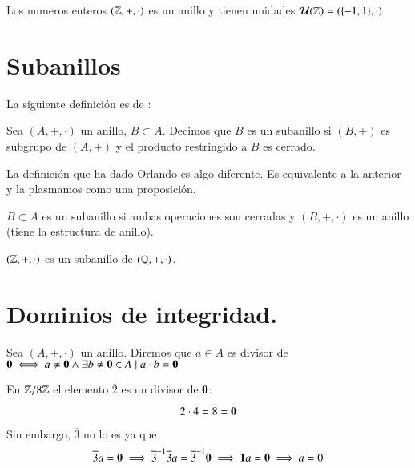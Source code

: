 \begin{ej}
	Los numeros enteros $(\mathbb{Z}, +, \cdot)$ es un anillo y tienen unidades $\mathcal{U}(\mathbb{Z}) = (\{-1, 1\}, \cdot)$
\end{ej}

\section{Subanillos}

La siguiente definición es de \cite{dor96}:

\begin{dfn}[Subanillo]
	Sea $(A, +, \cdot)$ un anillo, $B\subset A$. Decimos que $B$ es un subanillo si $(B, +)$ es subgrupo de  $(A, +)$ y el producto restringido a $B$ es cerrado.
\end{dfn}

La definición que ha dado Orlando es algo diferente. Es equivalente a la anterior y la plasmamos como una proposición.

\begin{pro}
	$B \subset A$ es un subanillo si ambas operaciones son cerradas y $(B, +, \cdot)$ es un anillo (tiene la estructura de anillo).
\end{pro}

\begin{ej}
	$(\mathbb{Z}, +, \cdot)$ es un subanillo de $(\mathbb{Q}, +, \cdot)$.
\end{ej}



\section{Dominios de integridad.}

\begin{dfn}[Divisor de 0]
	Sea $(A, +, \cdot)$ un anillo. Diremos que $a \in A$ es divisor de $\mathbf{0} \iff a \neq \mathbf{0} \land \exists b \neq \mathbf{0} \in A \mid a\cdot b = \mathbf{0}$
\end{dfn}

\begin{ej}
	En $\mathbb{Z}/8\mathbb{Z}$ el elemento $\overline{2}$ es un divisor de $\mathbf{0}$:
	\begin{align*}
		\overline{2}\cdot\overline{4} = \overline{8} = \mathbf{0}
	\end{align*}
	Sin embargo, $\overline{3}$ no lo es ya que
	\begin{align*}
		\overline{3}\overline{a} = \mathbf{0} \implies \overline{3}^{-1}\overline{3}\overline{a} = \overline{3}^{-1}\mathbf{0} \implies \mathbf{1} \overline{a} = \mathbf{0} \implies \overline{a} = 0
	\end{align*}
\end{ej}

